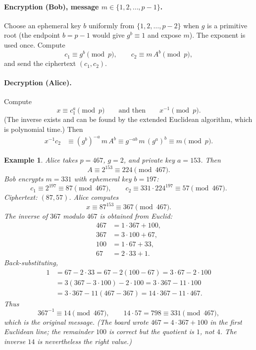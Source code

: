 \documentclass[11pt]{article}
\newtheorem{example}[theorem]{Example}
\theoremstyle{remark}
\begin{document}
\paragraph{Encryption (Bob), message $m\in\{1,2,\ldots,p-1\}$.}
Choose an ephemeral key $b$ uniformly from $\{1,2,\ldots,p-2\}$ when $g$
is a primitive root (the endpoint $b=p-1$ would give $g^b\equiv 1$ and
expose $m$). The exponent is used once. Compute
\[
    c_1 \equiv g^b \pmod{p},
    \qquad
    c_2 \equiv m\, A^b \pmod{p},
\]
and send the ciphertext $(c_1,c_2)$.

\paragraph{Decryption (Alice).}
Compute
\[
    x \equiv c_1^a \pmod{p}
    \qquad\text{and then}\qquad
    x^{-1}\pmod{p}.
\]
(The inverse exists and can be found by the extended Euclidean
algorithm, which is polynomial time.) Then
\begin{align*}
    x^{-1} c_2
    &\equiv
    (g^b)^{-a}\, m\, A^b
    \equiv
    g^{-ab}\, m\, (g^a)^b
    \equiv
    m \pmod{p}.
\end{align*}

\begin{example}
Alice takes $p=467$, $g=2$, and private key $a=153$. Then
\[
    A \equiv 2^{153} \equiv 224 \pmod{467}.
\]
Bob encrypts $m=331$ with ephemeral key $b=197$:
\[
    c_1 \equiv 2^{197} \equiv 87 \pmod{467},
    \qquad
    c_2 \equiv 331\cdot 224^{197} \equiv 57 \pmod{467}.
\]
Ciphertext: $(87,57)$. Alice computes
\[
    x \equiv 87^{153} \equiv 367 \pmod{467}.
\]
The inverse of $367$ modulo $467$ is obtained from Euclid:
\begin{align*}
    467 &= 1\cdot 367 + 100,\\
    367 &= 3\cdot 100 + 67,\\
    100 &= 1\cdot 67 + 33,\\
    67 &= 2\cdot 33 + 1.
\end{align*}
Back-substituting,
\begin{align*}
    1
    &=
    67-2\cdot 33
    =
    67-2(100-67)
    =
    3\cdot 67-2\cdot 100 \\
    &=
    3(367-3\cdot 100)-2\cdot 100
    =
    3\cdot 367-11\cdot 100 \\
    &=
    3\cdot 367-11(467-367)
    =
    14\cdot 367 - 11\cdot 467.
\end{align*}
Thus
\[
    367^{-1}\equiv 14 \pmod{467},
    \qquad
    14\cdot 57 = 798 \equiv 331 \pmod{467},
\]
which is the original message. (The board wrote $467=4\cdot 367+100$ in
the first Euclidean line; the remainder $100$ is correct but the
quotient is $1$, not $4$. The inverse $14$ is nevertheless the right
value.)
\end{example}
\end{document}
